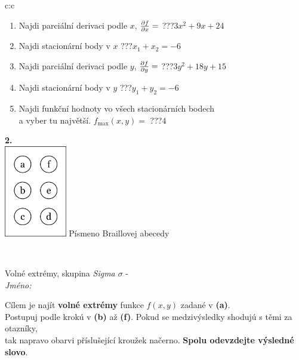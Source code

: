 \documentclass[10pt]{report}
\begin{document}
\begin{tabular}{c:c}
\begin{minipage}[c][104.5mm][t]{0.5\linewidth}
\begin{center}
\begin{minipage}{0.79\linewidth}
\begin{center}
\begin{varwidth}{\linewidth}
\begin{enumerate}
\item Najdi parciální derivaci podle $x$, $\pdv{f}{x}=$\quad \dotfill\; ???\;\dotfill \quad $3x^2+9x+24$
\item Najdi stacionární body v $x$\quad \dotfill\; ???\;\dotfill \quad $x_1+x_2=-6$
\item Najdi parciální derivaci podle $y$, $\pdv{f}{y}=$\quad \dotfill\; ???\;\dotfill \quad $3y^2+18y+15$
\item Najdi stacionární body v $y$\quad \dotfill\; ???\;\dotfill \quad $y_1+y_2=-6$
\item Najdi funkční hodnoty vo všech stacionárních bodech \\ \phantom{xxxxxx} a vyber tu najvětší. $f_{\text{max}}(x,y)=$\quad \dotfill\; ???\;\dotfill \quad $4$
\end{enumerate}
\end{varwidth}
\end{center}
\end{minipage}
\begin{minipage}{0.20\linewidth}
\begin{center}
{\Huge\bfseries 2.} \\[2mm]
\includegraphics[height=40mm]{../images/braille.png}
{\small Písmeno Braillovej abecedy}
\end{center}
\end{minipage}
\end{center}
\end{minipage}
\\ \hdashline
\begin{minipage}[c][104.5mm][t]{0.5\linewidth}
\begin{center}
\vspace{7mm}
{\huge Volné extrémy, skupina \textit{Sigma $\sigma$} -}\\[5mm]
\textit{Jméno:}\phantom{xxxxxxxxxxxxxxxxxxxxxxxxxxxxxxxxxxxxxxxxxxxxxxxxxxxxxxxxxxxxxxxxx}\\[5mm]
\begin{minipage}{0.95\linewidth}
\begin{center}
Cílem je najít \textbf{volné extrémy} funkce $f(x,y)$ zadané v \textbf{(a)}.\\Postupuj podle krokú v \textbf{(b)} až \textbf{(f)}. Pokud se medzivýsledky shodujú s těmi za otazníky,\\tak napravo obarvi příslušející kroužek načerno. \textbf{Spolu odevzdejte výsledné slovo}.

\end{center}
\end{minipage}
\end{center}
\end{minipage}
\end{tabular}
\end{document}
